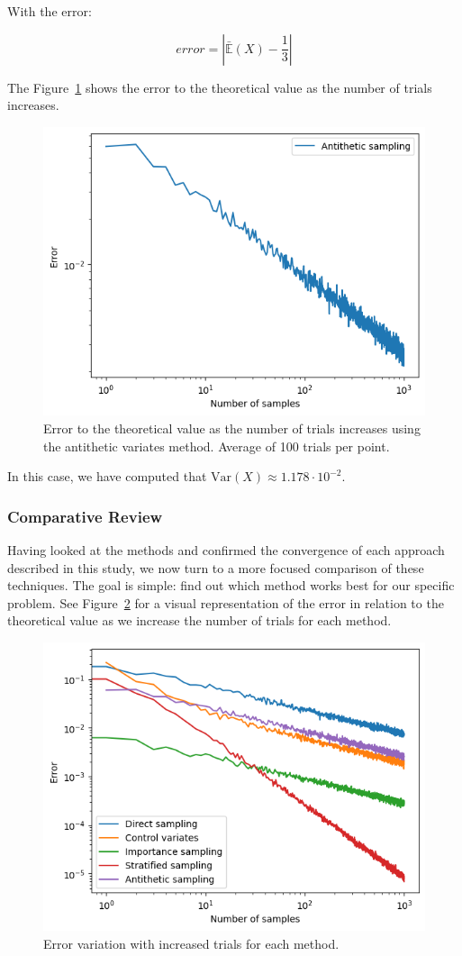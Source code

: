\documentclass{article}
\begin{document}
With the error:

\begin{equation*} error = | \bar{\mathbb{E}}(X) - \frac{1}{3} | \end{equation*}

The Figure~\ref{fig:antitheticvariates} shows the error to the theoretical value as the number of trials increases.

\begin{figure}[H]
	\centering
	\includegraphics[width=0.5\linewidth]{./Figures/VarianceReduction/antithetic.png}
	\caption{Error to the theoretical value as the number of trials increases using the antithetic variates method. Average of 100 trials per point.}
	\label{fig:antitheticvariates}
\end{figure}

In this case, we have computed that \(\mathrm{Var}(X) \approx 1.178 \cdot 10^{-2}\).

\subsubsection{Comparative Review}
\label{sec:comparative_review}

Having looked at the methods and confirmed the convergence of each approach described in this study, we now turn to a more focused comparison of these techniques. The goal is simple: find out which method works best for our specific problem. See Figure~\ref{fig:comparisonvariancereduction} for a visual representation of the error in relation to the theoretical value as we increase the number of trials for each method.

\begin{figure}[H]
\centering
\includegraphics[width=0.5\linewidth]{./Figures/VarianceReduction/comparison.png}
\caption{Error variation with increased trials for each method.}
\label{fig:comparisonvariancereduction}
\end{figure}
\end{document}
